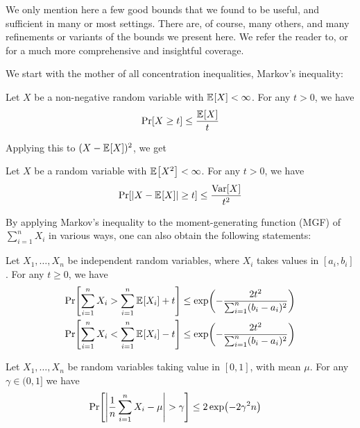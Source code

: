 We only mention here a few good bounds that we found to be useful, and sufficient in many or most settings. There are, of course, many others, and many refinements or variants of the bounds we present here. We refer the reader to, \eg \citet[Chapter~2]{Vershynin18} or~\citet{BoucheronLM13} for a much more comprehensive and insightful coverage. 

We start with the mother of all concentration inequalities, Markov's inequality:
\begin{theorem}
  \label{theo:markov}
Let $X$ be a non-negative random variable with $\bEE{X} < \infty$. For any $t > 0$, we have
\[  
  \bPr{ X \geq t } \leq \frac{\bEE{X}}{t}
\]
\end{theorem}
\noindent Applying this to $(X-\bEE{X})^2$, we get 
\begin{theorem}
  \label{theo:chebyshev}
Let $X$ be a random variable with $\bEE{X^2} < \infty$. For any $t > 0$, we have
\[  
  \bPr{ \abs{X-\bEE{X}} \geq t } \leq \frac{\Var[X]}{t^2}
\]
\end{theorem}
By applying Markov's inequality to the moment-generating function (MGF) of $\sum_{i=1}^n X_i$ in various ways, one can also obtain the following statements:
\begin{theorem}
  \label{theo:hoeffding}
Let $X_1,\dots,X_n$ be independent random variables, where $X_i$ takes values in $[a_i,b_i]$. For any $t \geq 0$, we have
\begin{align}
\bPr{ \sum_{i=1}^n X_i   > \sum_{i=1}^n \bEE{X_i} + t }  
&\leq \exp(-\frac{2 t^2}{\sum_{i=1}^n (b_i-a_i)^2}) \\
\bPr{\sum_{i=1}^n X_i  < \sum_{i=1}^n \bEE{X_i} - t }
 &\leq \exp(-\frac{2 t^2}{\sum_{i=1}^n (b_i-a_i)^2})
 \end{align}
\end{theorem}

\begin{corollary}
  \label{coro:hoeffding}
Let $X_1,\dots,X_n$ be \iid random variables taking value in $[0,1]$, with mean $\mu$. For any $\gamma \in (0,1]$ we have
\begin{align}
\bPr{ \abs{\frac{1}{n}\sum_{i=1}^n X_i  - \mu} > \gamma }
 &\leq 2\exp(-2 \gamma^2 n)
\end{align}
\end{corollary}

